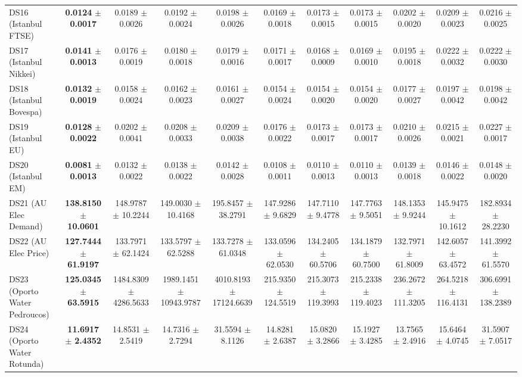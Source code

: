 \begin{table}[t]
{{\begin{tabular}{lcccccccccc}
DS16 (Istanbul FTSE) & \textbf{0.0124} $\pm$ \textbf{0.0017} & 0.0189 $\pm$ 0.0026 & 0.0192 $\pm$ 0.0024 & 0.0198 $\pm$ 0.0026 & 0.0169 $\pm$ 0.0018 & 0.0173 $\pm$ 0.0015 & 0.0173 $\pm$ 0.0015 & 0.0202 $\pm$ 0.0020 & 0.0209 $\pm$ 0.0023 & 0.0216 $\pm$ 0.0025 \\
DS17 (Istanbul Nikkei) & \textbf{0.0141} $\pm$ \textbf{0.0013} & 0.0176 $\pm$ 0.0019 & 0.0180 $\pm$ 0.0018 & 0.0179 $\pm$ 0.0016 & 0.0171 $\pm$ 0.0017 & 0.0168 $\pm$ 0.0009 & 0.0169 $\pm$ 0.0010 & 0.0195 $\pm$ 0.0018 & 0.0222 $\pm$ 0.0032 & 0.0222 $\pm$ 0.0030 \\
DS18 (Istanbul Bovespa) & \textbf{0.0132} $\pm$ \textbf{0.0019} & 0.0158 $\pm$ 0.0024 & 0.0162 $\pm$ 0.0023 & 0.0161 $\pm$ 0.0027 & 0.0154 $\pm$ 0.0024 & 0.0154 $\pm$ 0.0020 & 0.0154 $\pm$ 0.0020 & 0.0177 $\pm$ 0.0027 & 0.0197 $\pm$ 0.0042 & 0.0198 $\pm$ 0.0042 \\
DS19 (Istanbul EU) & \textbf{0.0128} $\pm$ \textbf{0.0022} & 0.0202 $\pm$ 0.0041 & 0.0208 $\pm$ 0.0033 & 0.0209 $\pm$ 0.0038 & 0.0176 $\pm$ 0.0022 & 0.0173 $\pm$ 0.0017 & 0.0173 $\pm$ 0.0017 & 0.0210 $\pm$ 0.0026 & 0.0215 $\pm$ 0.0021 & 0.0227 $\pm$ 0.0017 \\
DS20 (Istanbul EM) & \textbf{0.0081} $\pm$ \textbf{0.0013} & 0.0132 $\pm$ 0.0022 & 0.0138 $\pm$ 0.0022 & 0.0142 $\pm$ 0.0028 & 0.0108 $\pm$ 0.0011 & 0.0110 $\pm$ 0.0013 & 0.0110 $\pm$ 0.0013 & 0.0139 $\pm$ 0.0018 & 0.0146 $\pm$ 0.0022 & 0.0148 $\pm$ 0.0020 \\
DS21 (AU Elec Demand) & \textbf{138.8150} $\pm$ \textbf{10.0601} & 148.9787 $\pm$ 10.2244 & 149.0030 $\pm$ 10.4168 & 195.8457 $\pm$ 38.2791 & 147.9286 $\pm$ 9.6829 & 147.7110 $\pm$ 9.4778 & 147.7763 $\pm$ 9.5051 & 148.1353 $\pm$ 9.9244 & 145.9475 $\pm$ 10.1612 & 182.8934 $\pm$ 28.2230 \\
DS22 (AU Elec Price) & \textbf{127.7444} $\pm$ \textbf{61.9197} & 133.7971 $\pm$ 62.1424 & 133.5797 $\pm$ 62.5288 & 133.7278 $\pm$ 61.0348 & 133.0596 $\pm$ 62.0530 & 134.2405 $\pm$ 60.5706 & 134.1879 $\pm$ 60.7500 & 132.7971 $\pm$ 61.8009 & 142.6057 $\pm$ 63.4572 & 141.3992 $\pm$ 61.5570 \\
DS23 (Oporto Water Pedroucos) & \textbf{125.0345} $\pm$ \textbf{63.5915} & 1484.8309 $\pm$ 4286.5633 & 1989.1451 $\pm$ 10943.9787 & 4010.8193 $\pm$ 17124.6639 & 215.9350 $\pm$ 124.5519 & 215.3073 $\pm$ 119.3993 & 215.2338 $\pm$ 119.4023 & 236.2672 $\pm$ 111.3205 & 264.5218 $\pm$ 116.4131 & 306.6991 $\pm$ 138.2389 \\
DS24 (Oporto Water Rotunda) & \textbf{11.6917} $\pm$ \textbf{2.4352} & 14.8531 $\pm$ 2.5419 & 14.7316 $\pm$ 2.7294 & 31.5594 $\pm$ 8.1126 & 14.8281 $\pm$ 2.6387 & 15.0820 $\pm$ 3.2866 & 15.1927 $\pm$ 3.4285 & 13.7565 $\pm$ 2.4916 & 15.6464 $\pm$ 4.0745 & 31.5907 $\pm$ 7.0517 \\
\bottomrule
\end{tabular}%
}%
}
\end{table}
